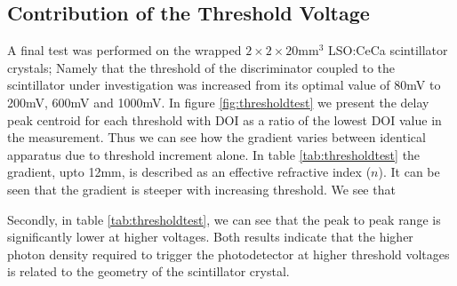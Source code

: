 \subsection{Contribution of the Threshold Voltage}

A final test was performed on the wrapped $2\times2\times20$mm$^3$ LSO:CeCa scintillator crystals; Namely that the threshold of the discriminator coupled to the scintillator under investigation was increased from its optimal value of 80mV to 200mV, 600mV and 1000mV. In figure \ref{fig:thresholdtest} we present the delay peak centroid for each threshold with DOI as a ratio of the lowest DOI value in the measurement. Thus we can see how the gradient varies between identical apparatus due to threshold increment alone. In table \ref{tab:thresholdtest} the gradient, upto 12mm, is described as an effective refractive index ($n$). It can be seen that the gradient is steeper with increasing threshold. We see that


Secondly, in table \ref{tab:thresholdtest}, we can see that the peak to peak range is significantly lower at higher voltages. Both results indicate that the higher photon density required to trigger the photodetector at higher threshold voltages is related to the geometry of the scintillator crystal.

